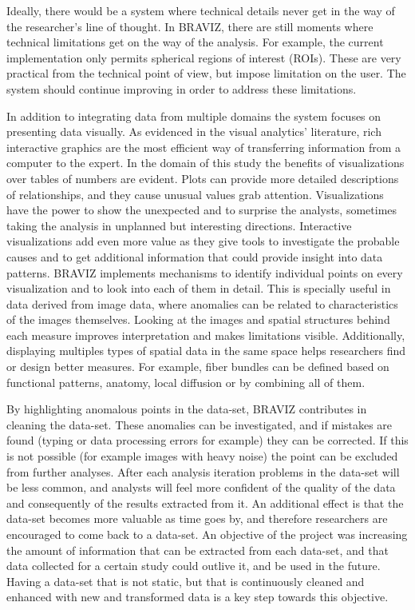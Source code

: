 Ideally, there would be a system where technical details never get in the way of the researcher's line of thought. In BRAVIZ, there are still moments where technical limitations get on the way of the analysis.  For example, the current implementation only permits spherical regions of interest (ROIs). These are very practical from the technical point of view, but impose limitation on the user. The system should continue improving in order to address these limitations.

In addition to integrating data from multiple domains the system focuses on presenting data visually. As evidenced in the visual analytics' literature, rich interactive graphics are the most efficient way of transferring information from a computer to the expert. In the domain of this study the benefits of visualizations over tables of numbers are evident. Plots can provide more detailed descriptions of relationships, and they cause unusual values grab attention. Visualizations have the power to show the unexpected and to surprise the analysts, sometimes taking the analysis in unplanned but interesting directions. Interactive visualizations add even more value as they give tools to investigate the probable causes and to get additional information that could provide insight into data patterns. BRAVIZ implements mechanisms to identify individual points on every visualization and to look into each of them in detail. This is specially useful in data derived from image data, where anomalies can be related to characteristics of the images themselves. Looking at the images and spatial structures behind each measure improves interpretation and makes limitations visible. Additionally, displaying multiples types of spatial data in the same space helps researchers find or design better measures. For example, fiber bundles can be defined based on functional patterns, anatomy, local diffusion or by combining all of them.

By highlighting anomalous points in the data-set, BRAVIZ contributes in cleaning the data-set. These anomalies can be investigated, and if mistakes are found (typing or data processing errors for example) they can be corrected. If this is not possible (for example images with heavy noise) the point can be excluded from further analyses. After each analysis iteration problems in the data-set will be less common, and analysts will feel more confident of the quality of the data and consequently of the results extracted from it. An additional effect is that the data-set becomes more valuable as time goes by, and therefore researchers are encouraged to come back to a data-set. An objective of the project was increasing the amount of information that can be extracted from each data-set, and that data collected for a certain study could outlive it, and be used in the future. Having a data-set that is not static, but that is continuously cleaned and enhanced with new and transformed data is a key step towards this objective.

